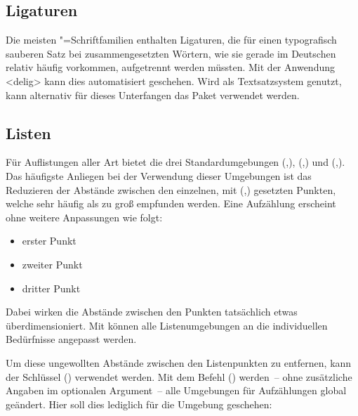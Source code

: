 \documentclass[%
  english,ngerman,%
  cdgeometry=no,DIV=12,automark,%
]{tudscrartcl}
\begin{document}
\subsection{Ligaturen}
Die meisten "=Schriftfamilien enthalten Ligaturen, die für einen 
typografisch sauberen Satz bei zusammengesetzten Wörtern, wie sie gerade im 
Deutschen relativ häufig vorkommen, aufgetrennt werden müssten. Mit der 
Anwendung <delig> kann dies automatisiert geschehen. Wird 
 als Textsatzsystem genutzt, kann alternativ für dieses 
Unterfangen das Paket  verwendet werden.


\subsection{Listen}
\label{sec:lists}%
%
Für Auflistungen aller Art bietet  die drei Standardumgebungen 
(,),
(,) und
(,). Das 
häufigste Anliegen bei der Verwendung dieser Umgebungen ist das Reduzieren 
der Abstände zwischen den einzelnen, mit 
(,) gesetzten Punkten, 
welche sehr häufig als zu groß empfunden werden. Eine Aufzählung erscheint ohne 
weitere Anpassungen wie folgt:
%
\begin{Hint*}
\begin{itemize}
\item erster Punkt
\item zweiter Punkt
\item dritter Punkt
\end{itemize}
\end{Hint*}
%
Dabei wirken die Abstände zwischen den Punkten tatsächlich etwas 
überdimensioniert. Mit  können alle Listenumgebungen an die 
individuellen Bedürfnisse angepasst werden. 
%
\begin{Preamble}
\usepackage{enumitem}
\end{Preamble}
%
Um diese ungewollten Abstände zwischen den Listenpunkten zu entfernen, kann der 
Schlüssel () verwendet werden. Mit dem 
Befehl () werden~-- ohne zusätzliche Angaben 
im optionalen Argument~-- alle Umgebungen für Aufzählungen global geändert. 
Hier soll dies lediglich für die Umgebung  geschehen:
\end{document}
